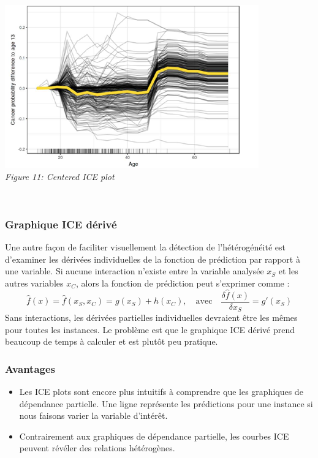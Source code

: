 \begin{center}
    \centering
    \includegraphics[width=0.7\linewidth]{Images/centered_ice.png}
    \\
    \emph{Figure 11: Centered ICE plot}
    \\
\end{center}
\\

\subsubsection{Graphique ICE dérivé}
Une autre façon de faciliter visuellement la détection de l'hétérogénéité est d'examiner les dérivées individuelles de la fonction de prédiction par rapport à une variable. Si aucune interaction n'existe entre la variable analysée \( x_S \) et les autres variables \( x_C \), alors la fonction de prédiction peut s'exprimer comme :
\[ \hat{f}(x) = \hat{f}(x_S,x_C) = g(x_S) + h(x_C), \quad\text{avec}\quad \frac{\delta\hat{f}(x)}{\delta{}x_S} = g'(x_S) \]
Sans interactions, les dérivées partielles individuelles devraient être les mêmes pour toutes les instances. Le problème est que le graphique ICE dérivé prend beaucoup de temps à calculer et est plutôt peu pratique.

\subsubsection{Avantages}
\begin{itemize}
    \item Les ICE plots sont encore plus intuitifs à comprendre que les graphiques de dépendance partielle. Une ligne représente les prédictions pour une instance si nous faisons varier la variable d'intérêt.
    \item Contrairement aux graphiques de dépendance partielle, les courbes ICE peuvent révéler des relations hétérogènes.
\end{itemize}

